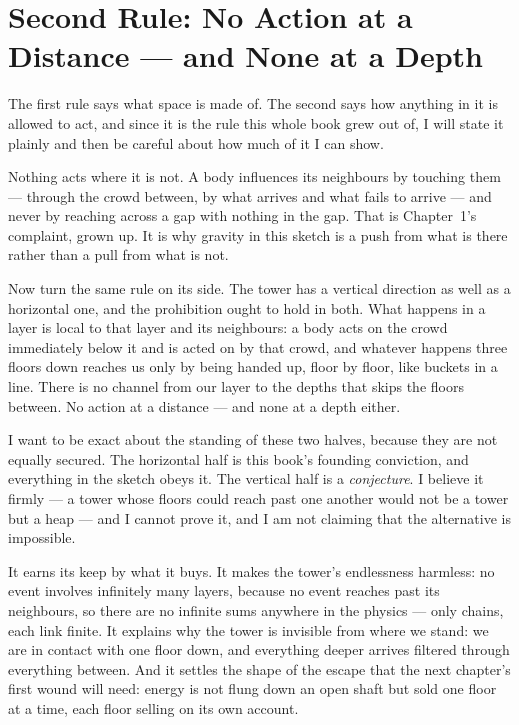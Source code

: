 \section{Second Rule: No Action at a Distance --- and None at a Depth}

The first rule says what space is made of. The second says how anything in it is allowed to act, and since it is the rule this whole book grew out of, I will state it plainly and then be careful about how much of it I can show.

Nothing acts where it is not. A body influences its neighbours by touching them --- through the crowd between, by what arrives and what fails to arrive --- and never by reaching across a gap with nothing in the gap. That is Chapter~1's complaint, grown up. It is why gravity in this sketch is a push from what is there rather than a pull from what is not.

Now turn the same rule on its side. The tower has a vertical direction as well as a horizontal one, and the prohibition ought to hold in both. What happens in a layer is local to that layer and its neighbours: a body acts on the crowd immediately below it and is acted on by that crowd, and whatever happens three floors down reaches us only by being handed up, floor by floor, like buckets in a line. There is no channel from our layer to the depths that skips the floors between. No action at a distance --- and none at a depth either.

I want to be exact about the standing of these two halves, because they are not equally secured. The horizontal half is this book's founding conviction, and everything in the sketch obeys it. The vertical half is a \emph{conjecture}. I believe it firmly --- a tower whose floors could reach past one another would not be a tower but a heap --- and I cannot prove it, and I am not claiming that the alternative is impossible.

It earns its keep by what it buys. It makes the tower's endlessness harmless: no event involves infinitely many layers, because no event reaches past its neighbours, so there are no infinite sums anywhere in the physics --- only chains, each link finite. It explains why the tower is invisible from where we stand: we are in contact with one floor down, and everything deeper arrives filtered through everything between. And it settles the shape of the escape that the next chapter's first wound will need: energy is not flung down an open shaft but sold one floor at a time, each floor selling on its own account.


